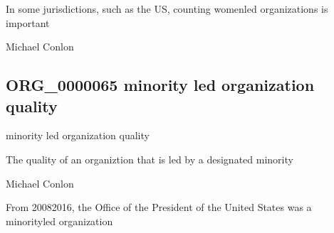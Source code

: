 \documentclass[letterpaper,10pt,english]{sphinxmanual}
\begin{document}
\begin{sphinxShadowBox}

\sphinxAtStartPar
In some jurisdictions, such as the US, counting women\sphinxhyphen{}led organizations is important
\end{sphinxShadowBox}

\begin{sphinxShadowBox}

\sphinxAtStartPar
Michael Conlon 
\end{sphinxShadowBox}
\begin{quote}

\ignorespaces \end{quote}


\subsection{ORG\_0000065 \sphinxhyphen{} minority led organization quality}
\label{\detokenize{doc-ORG_0000065:org-0000065-minority-led-organization-quality}}\label{\detokenize{doc-ORG_0000065:index-0}}\label{\detokenize{doc-ORG_0000065::doc}}
\begin{sphinxShadowBox}

\sphinxAtStartPar
minority led organization quality
\end{sphinxShadowBox}

\begin{sphinxShadowBox}

\sphinxAtStartPar
The quality of an organiztion that is led by a designated minority
\end{sphinxShadowBox}

\begin{sphinxShadowBox}

\sphinxAtStartPar
Michael Conlon 
\end{sphinxShadowBox}

\begin{sphinxShadowBox}

\sphinxAtStartPar
From 2008\sphinxhyphen{}2016, the Office of the President of the United States was a minority\sphinxhyphen{}led organization
\end{sphinxShadowBox}
\end{document}
